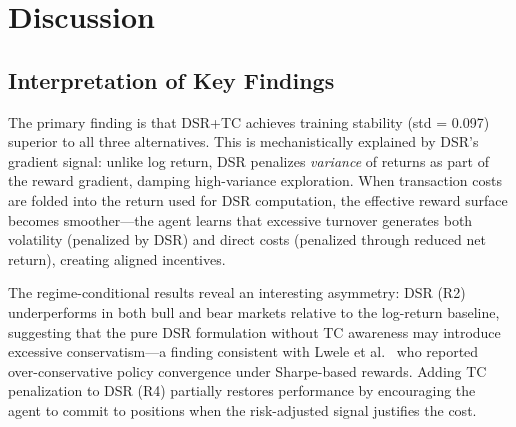 \documentclass[conference]{IEEEtran}
\begin{document}
\section{Discussion}
\label{sec:discussion}

\subsection{Interpretation of Key Findings}
The primary finding is that DSR+TC achieves training stability (std = 0.097)
superior to all three alternatives. This is mechanistically explained by DSR's
gradient signal: unlike log return, DSR penalizes \emph{variance} of returns as
part of the reward gradient, damping high-variance exploration. When transaction
costs are folded into the return used for DSR computation, the effective reward
surface becomes smoother—the agent learns that excessive turnover generates both
volatility (penalized by DSR) and direct costs (penalized through reduced net
return), creating aligned incentives.

The regime-conditional results reveal an interesting asymmetry: DSR (R2) underperforms
in both bull and bear markets relative to the log-return baseline, suggesting that
the pure DSR formulation without TC awareness may introduce excessive
conservatism—a finding consistent with Lwele et al.~\cite{Lwele2025RiskAware} who
reported over-conservative policy convergence under Sharpe-based rewards. Adding
TC penalization to DSR (R4) partially restores performance by encouraging the agent
to commit to positions when the risk-adjusted signal justifies the cost.
\end{document}
